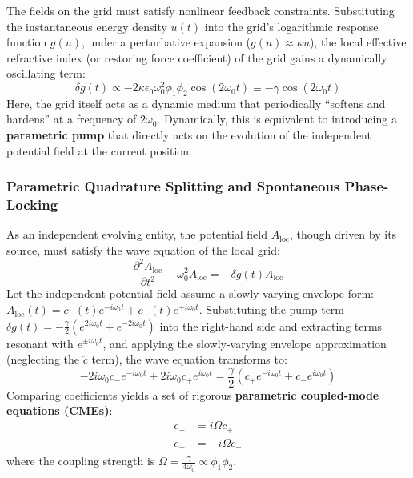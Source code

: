 \documentclass[12pt, a4paper]{article}
\begin{document}
The fields on the grid must satisfy nonlinear feedback constraints. Substituting the instantaneous energy density $u(t)$ into the grid's logarithmic response function $g(u)$, under a perturbative expansion ($g(u) \approx \kappa u$), the local effective refractive index (or restoring force coefficient) of the grid gains a dynamically oscillating term:
\begin{equation}
\delta g(t) \propto - 2\kappa \epsilon_0 \omega_0^2 \phi_1 \phi_2 \cos(2\omega_0 t) \equiv - \gamma \cos(2\omega_0 t)
\end{equation}
Here, the grid itself acts as a dynamic medium that periodically ``softens and hardens'' at a frequency of $2\omega_0$. Dynamically, this is equivalent to introducing a \textbf{parametric pump} that directly acts on the evolution of the independent potential field at the current position.

\subsubsection{Parametric Quadrature Splitting and Spontaneous Phase-Locking}

As an independent evolving entity, the potential field $A_{\mathrm{loc}}$, though driven by its source, must satisfy the wave equation of the local grid:
\begin{equation}
\frac{\partial^2 A_{\mathrm{loc}}}{\partial t^2} + \omega_0^2 A_{\mathrm{loc}} = - \delta g(t) A_{\mathrm{loc}}
\end{equation}
Let the independent potential field assume a slowly-varying envelope form: $A_{\mathrm{loc}}(t) = c_-(t) e^{-i\omega_0 t} + c_+(t) e^{+i\omega_0 t}$. Substituting the pump term $\delta g(t) = -\frac{\gamma}{2}(e^{2i\omega_0 t} + e^{-2i\omega_0 t})$ into the right-hand side and extracting terms resonant with $e^{\pm i\omega_0 t}$, and applying the slowly-varying envelope approximation (neglecting the $\ddot{c}$ term), the wave equation transforms to:
\begin{equation}
-2i\omega_0 \dot{c}_- e^{-i\omega_0 t} + 2i\omega_0 \dot{c}_+ e^{i\omega_0 t} = \frac{\gamma}{2} \left( c_+ e^{-i\omega_0 t} + c_- e^{i\omega_0 t} \right)
\end{equation}
Comparing coefficients yields a set of rigorous \textbf{parametric coupled-mode equations (CMEs)}:
\begin{align}
\dot{c}_- &= i \Omega c_+ \\
\dot{c}_+ &= -i \Omega c_-
\end{align}
where the coupling strength is $\Omega = \frac{\gamma}{4\omega_0} \propto \phi_1 \phi_2$.
\end{document}
